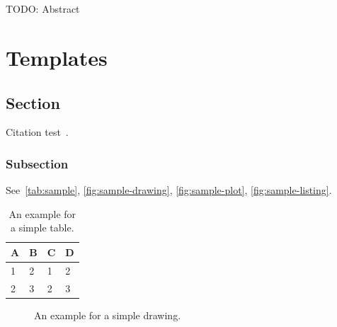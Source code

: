 \documentclass[headsepline,footsepline,footinclude=false,oneside,fontsize=11pt,paper=a4,listof=totoc,bibliography=totoc]{scrbook} %
\begin{document}
%
\chapter{\abstractname}

TODO: Abstract

\tableofcontents{}

\mainmatter{}




\chapter{Templates}\label{chapter:templates}

\section{Section}
Citation test~\parencite{latex}.

\subsection{Subsection}

See~\autoref{tab:sample}, \autoref{fig:sample-drawing}, \autoref{fig:sample-plot}, \autoref{fig:sample-listing}.

\begin{table}[htpb]
  \caption[Example table]{An example for a simple table.}\label{tab:sample}
  \centering
  \begin{tabular}{l l l l}
    \toprule
      A & B & C & D \\
    \midrule
      1 & 2 & 1 & 2 \\
      2 & 3 & 2 & 3 \\
    \bottomrule
  \end{tabular}
\end{table}

\begin{figure}[htpb]
  \centering
  \caption[Example drawing]{An example for a simple drawing.}\label{fig:sample-drawing}
\end{figure}
\end{document}
